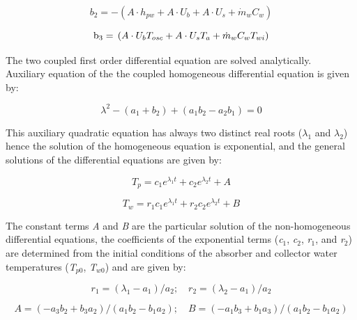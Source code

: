 \begin{equation}
{b_2} =  - \left( {A \cdot {h_{pw}} + A \cdot {U_b} + A \cdot {U_s} + {{\dot m}_w}{C_w}} \right)
\end{equation}

\begin{equation}
{{\rm{b}}_{\rm{3}}} = {\rm{ }}\left( {A \cdot {U_b}{T_{osc}} + A \cdot {U_s}{T_a} + {{\dot m}_w}{C_w}{T_{wi}}} \right)
\end{equation}

The two coupled first order differential equation are solved analytically.~ Auxiliary equation of the the coupled homogeneous differential equation is given by:

\begin{equation}
{\lambda ^2} - ({a_1} + {b_2}) + ({a_1}{b_2} - {a_2}{b_1}) = 0
\end{equation}

This auxiliary quadratic equation has always two distinct real roots (\(\lambda_{1}\) and \(\lambda_{2}\)) hence the solution of the homogeneous equation is exponential, and the general solutions of the differential equations are given by:

\begin{equation}
{T_p} =  {c_1}{e^{{\lambda_1}t}} + {c_2}{e^{{\lambda_2}t}} + A
\end{equation}

\begin{equation}
{T_w} =  {r_1}{c_1}{e^{{\lambda_1}t}} + {r_2}{c_2}{e^{{\lambda_2}t}} + B
\end{equation}

The constant terms \emph{A} and \emph{B} are the particular solution of the non-homogeneous differential equations, the coefficients of the exponential terms (\emph{c\(_{1}\)}, \emph{c\(_{2}\)}, \emph{r\(_{1}\)}, and \emph{r\(_{2}\)}) are determined from the initial conditions of the absorber and collector water temperatures (\emph{T\(_{p0}\)}, \emph{T\(_{w0}\)}) and are given by:

\begin{equation}
{r_1} =  ({\lambda_1} - {a_1})/{a_2};\quad {r_2} =  ({\lambda_2} - {a_1})/{a_2}
\end{equation}

\begin{equation}
A =  ( - {a_3}{b_2} + {b_3}{a_2})/({a_1}{b_2} - {b_1}{a_2});\quad B =  ( - {a_1}{b_3} + {b_1}{a_3})/({a_1}{b_2} - {b_1}{a_2})
\end{equation}

